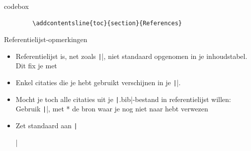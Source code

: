 \begin{saveblock}{codebox}
	\begin{verbatim}
		\addcontentsline{toc}{section}{References}
	\end{verbatim}
\end{saveblock}

\begin{frame}{Referentielijst-opmerkingen}%
	\begin{itemize}[label=\textbullet]
		\item Referentielijst is, net zoals \texttt|\tableofcontents|, niet standaard opgenomen in je
		inhoudstabel. Dit fix je met
		\pause
		
		\item Enkel citaties die je hebt gebruikt verschijnen in je \texttt|\printbibliography|.
		\item Mocht je toch alle citaties uit je \texttt|.bib|-bestand in referentielijst willen:\\
		Gebruik \texttt|\nocite{*}|, met * de bron waar je nog niet naar hebt verwezen \pause
		\item Zet standaard aan \texttt|\usepackage[backend=biber]{biblatex}|
	\end{itemize}
\end{frame}


